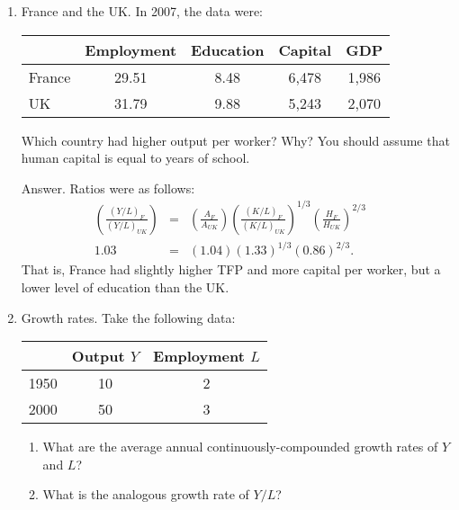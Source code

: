 \setlength{\leftmargini}{.5\oldleftmargini}
\begin{enumerate}
\item France and the UK.  In 2007, the data were:
%
\begin{center}
\begin{tabular}{lcccc}
\toprule
                &   Employment   & Education & Capital  & GDP \\%
\midrule
France  &  29.51 &  8.48 &  6,478 &  1,986 \\
UK      &  31.79 &  9.88 &  5,243 &  2,070 \\
\bottomrule
\end{tabular}
\end{center}
%
Which country had higher output per worker?  Why?
You should assume that human capital is equal to years of school.

Answer.  Ratios were as follows:
\begin{eqnarray*}
    \left( \frac{(Y/L)_{F}}{(Y/L)_{UK}} \right) &=& \left( \frac{A_{F}}{A_{UK}} \right)
                        \left( \frac{(K/L)_{F}}{(K/L)_{UK}} \right)^{1/3}
                        \left( \frac{H_{F}}{H_{UK}} \right)^{2/3}  \\
            1.03              &=&   (1.04) (1.33)^{1/3} (0.86)^{2/3}  . \phantom{\sum^\infty}
\end{eqnarray*}
That is, France had slightly higher TFP and more capital per worker,
but a lower level of education than the UK.


\item Growth rates.  Take the following data:
%
\begin{center}
\begin{tabular}{lcc}
\toprule
                & Output $Y$  & Employment $L$ \\
\midrule
1950 \hspace*{0.25in} &  10 & 2 \\
2000  &  50 & 3 \\
\bottomrule
\end{tabular}
\end{center}
%
\begin{enumerate}
\item What are the average annual continuously-compounded growth rates of $Y$ and $L$?
\item What is the analogous growth rate of $Y/L$?
\end{enumerate}


\end{enumerate}
